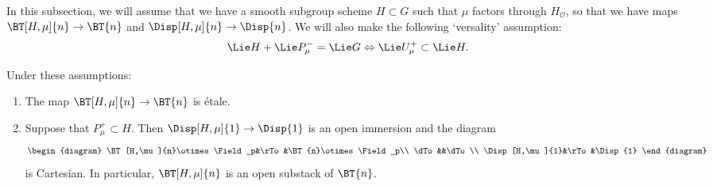 \documentclass[10pt]{amsart}
\begin{document}
In this subsection, we will assume that we have a smooth subgroup scheme $H\subset G$ such that $\mu$ factors through $H_{\mathcal{O}}$, so that we have maps $\BT[H,\mu]{n}\to \BT{n}$ and $\Disp[H,\mu]{n}\to \Disp{n}$. We will also make the following `versality' assumption:
\[
\Lie H + \Lie P^-_\mu = \Lie G \Leftrightarrow \Lie U^+_\mu \subset \Lie H.
\]

\begin{proposition}
\label{prop:special_open}
Under these assumptions:
\begin{enumerate}
   \item The map $\BT[H,\mu]{n}\to \BT{n}$ is \'etale.
   \item Suppose that $ P^+_\mu\subset H$. Then $\Disp[H,\mu]{1}\to \Disp{1}$ is an open immersion and the diagram
   \[
   \begin{diagram}
   \BT[H,\mu]{n}\otimes\Field_p&\rTo&\BT{n}\otimes\Field_p\\
     \dTo&&\dTo\\
     \Disp[H,\mu]{1}&\rTo&\Disp{1}
   \end{diagram} 
   \]
   is Cartesian. In particular, $\BT[H,\mu]{n}$ is an open substack of $\BT{n}$.
\end{enumerate}
\end{proposition} 
\end{document}
